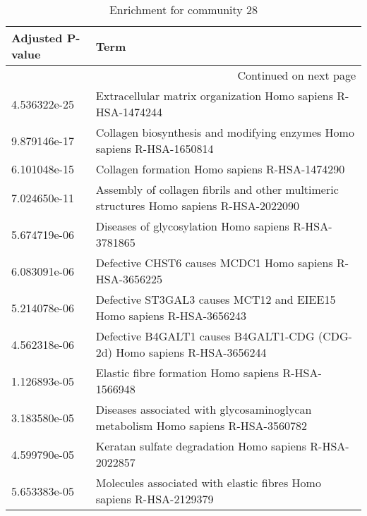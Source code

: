 \begin{longtable}{p{2.4cm}p{14.5cm}}
\caption{Enrichment for community 28}\\
\toprule
Adjusted \newline P-value &                                                                                                    Term \\
\midrule
\endhead
\midrule
\multicolumn{2}{r}{{Continued on next page}} \\
\midrule
\endfoot

\bottomrule
\endlastfoot
             4.536322e-25 &                                            Extracellular matrix organization Homo sapiens R-HSA-1474244 \\
             9.879146e-17 &                                  Collagen biosynthesis and modifying enzymes Homo sapiens R-HSA-1650814 \\
             6.101048e-15 &                                                           Collagen formation Homo sapiens R-HSA-1474290 \\
             7.024650e-11 &                 Assembly of collagen fibrils and other multimeric structures Homo sapiens R-HSA-2022090 \\
             5.674719e-06 &                                                    Diseases of glycosylation Homo sapiens R-HSA-3781865 \\
             6.083091e-06 &                                                 Defective CHST6 causes MCDC1 Homo sapiens R-HSA-3656225 \\
             5.214078e-06 &                                    Defective ST3GAL3 causes MCT12 and EIEE15 Homo sapiens R-HSA-3656243 \\
             4.562318e-06 &                                Defective B4GALT1 causes B4GALT1-CDG (CDG-2d) Homo sapiens R-HSA-3656244 \\
             1.126893e-05 &                                                      Elastic fibre formation Homo sapiens R-HSA-1566948 \\
             3.183580e-05 &                        Diseases associated with glycosaminoglycan metabolism Homo sapiens R-HSA-3560782 \\
             4.599790e-05 &                                                  Keratan sulfate degradation Homo sapiens R-HSA-2022857 \\
             5.653383e-05 &                                     Molecules associated with elastic fibres Homo sapiens R-HSA-2129379 \\

\end{longtable}
